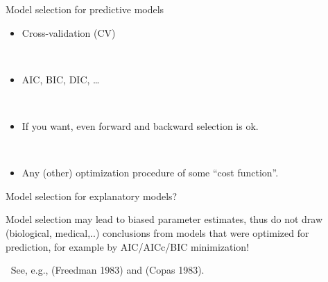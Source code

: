 \documentclass[
  10pt,
  ignorenonframetext,
]{beamer}
\providecommand{\tightlist}{%
  \setlength{\itemsep}{0pt}\setlength{\parskip}{0pt}}
\begin{document}
\begin{frame}
\begin{block}{Model selection for predictive models}
\protect\hypertarget{model-selection-for-predictive-models}{}
\(~\)

\begin{itemize}
\tightlist
\item
  Cross-validation (CV)
\end{itemize}

\(~\)

\begin{itemize}
\tightlist
\item
  AIC, BIC, DIC, \ldots{}
\end{itemize}

\(~\)

\begin{itemize}
\tightlist
\item
  If you want, even forward and backward selection is ok.
\end{itemize}

\(~\)

\begin{itemize}
\tightlist
\item
  Any (other) optimization procedure of some ``cost function''.
\end{itemize}
\end{block}
\end{frame}

\begin{frame}
\begin{block}{Model selection for explanatory models?}
\protect\hypertarget{model-selection-for-explanatory-models}{}
\(~\)

\begin{tcolorbox}
Model selection may lead to biased parameter estimates, thus do not draw (biological, medical,..) conclusions from models that were optimized for prediction, for example by AIC/AICc/BIC minimization!
\end{tcolorbox}

\(~\) \scriptsize See, e.g., (Freedman 1983) and (Copas 1983).
\end{block}
\end{frame}
\end{document}
